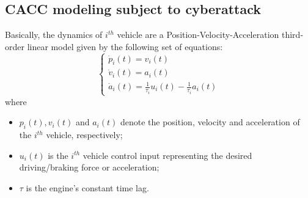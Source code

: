 {\subsection{CACC modeling subject to cyberattack}
Basically, the dynamics of $i^{th}$ vehicle are a Position-Velocity-Acceleration third-order linear model given by the following set of equations:
\begin{equation}\label{eq_1}
      \left\{ \begin{array}{l}
        \dot{p}_i(t) =v_i(t) \\
        \dot{v}_i(t)  =a_i(t) \\
        \dot{a}_i(t)  =\frac{1}{\tau_i} u_i(t)-\frac{1}{\tau_i} a_i(t)\end{array}\right.
\end{equation}  
where
\begin{itemize}
\item $p_i(t), v_i(t)$ and $a_i(t)$ denote the position, velocity and
acceleration of the $i^{th}$  vehicle, respectively;
\item $u_i(t)$ is the $i^{th}$ vehicle control input representing the desired
driving/braking force or acceleration;
 \item $\tau$ is the engine's constant time lag. 
 \end{itemize}
%
%
%
%

}
